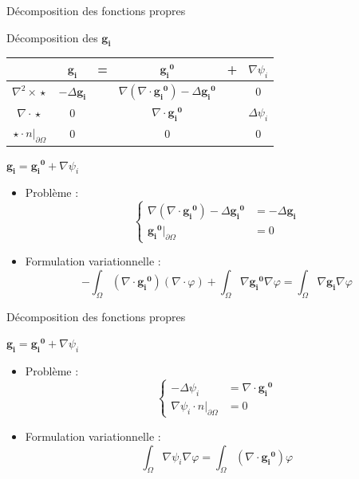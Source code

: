 \documentclass{beamer}
\newcommand{\grad}{{\nabla}}
\newcommand{\laplace}{{\Delta}}
\newcommand{\rott}{{\nabla^2\times}}
\newcommand{\diverg}{{\nabla\cdot}}
\newcommand{\restr}{{\big\rvert_{\partial\Omega}}}
\begin{document}
\begin{frame}{Décomposition des fonctions propres}
\begin{block}{Décomposition des $\mathbf{g_i}$}
\begin{center}
\begin{tabular}{c|ccccc}
& $\mathbf{g_i}$ & = & $\mathbf{\mathbf{g_i}^0}$ & + & $\grad\psi_i$ \\ \hline
$\rott\star$ & $-\laplace \mathbf{g_i}$ & & $\grad(\diverg \mathbf{\mathbf{g_i}^0})-\laplace \mathbf{\mathbf{g_i}^0}$ & & 0\\ \hline
$\diverg\star$ & 0 & & $\diverg \mathbf{\mathbf{g_i}^0}$ & & $\laplace\psi_i$\\ \hline
$\star\cdot n\restr$ & 0 & & 0 & & 0
\end{tabular}
\end{center}
\end{block}
\begin{block}{$\mathbf{g_i}=\mathbf{\mathbf{g_i}^0}+\grad\psi_i$}
\begin{itemize}
\item Problème :
\[
\left\{
\begin{aligned}
\grad(\diverg \mathbf{\mathbf{g_i}^0})-\laplace \mathbf{\mathbf{g_i}^0} &= -\laplace \mathbf{g_i}\\
\mathbf{\mathbf{g_i}^0}\restr &= 0
\end{aligned}
\right.
\]
\item Formulation variationnelle :
\[
-\int_\Omega (\diverg \mathbf{\mathbf{g_i}^0})(\diverg\varphi) + \int_\Omega \grad \mathbf{\mathbf{g_i}^0}\grad\varphi = \int_\Omega \grad \mathbf{g_i}\grad\varphi
\]
\end{itemize}
\end{block}
\end{frame}

\begin{frame}{Décomposition des fonctions propres}
\begin{block}{$\mathbf{g_i}=\mathbf{\mathbf{g_i}^0}+\grad\psi_i$}
\begin{itemize}
\item Problème :
\[
\left\{
\begin{aligned}
-\laplace\psi_i &= \diverg \mathbf{\mathbf{g_i}^0}\\
\grad\psi_i\cdot n\restr &= 0
\end{aligned}
\right.
\]
\item Formulation variationnelle :
\[
\int_\Omega \grad\psi_i\grad\varphi = \int_\Omega (\diverg \mathbf{\mathbf{g_i}^0})\varphi
\]
\end{itemize}
\end{block}
\end{frame}
\end{document}
